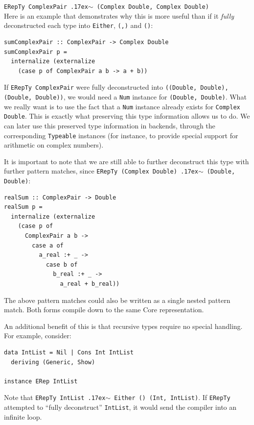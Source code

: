 \documentclass[runningheads, a4paper]{llncs}
\newcommand{\typeeq}{\raise.17ex\hbox{$\scriptstyle\mathtt{\sim}$}\,\;}
\newcommand{\ttt}{\texttt}
\begin{document}
\ttt{ERepTy ComplexPair \typeeq (Complex Double, Complex Double)}
\\

Here is an example that demonstrates why this is more useful than if it \textit{fully} deconstructed
each type into \ttt{Either}, \ttt{(,)} and \ttt{()}:

\begin{lstlisting}
sumComplexPair :: ComplexPair -> Complex Double
sumComplexPair p =
  internalize (externalize
    (case p of ComplexPair a b -> a + b))
\end{lstlisting}

If \ttt{ERepTy ComplexPair} were fully deconstructed into \ttt{((Double, Double),
(Double, Double))}, we would need a \ttt{Num} instance for \ttt{(Double,
Double)}.  What we really want is to use the fact that a \ttt{Num} instance
already exists for \ttt{Complex Double}. This is exactly what preserving this
type information allows us to do. We can later use this preserved type
information in backends, through the corresponding \ttt{Typeable} instances (for
instance, to provide special support for arithmetic on complex numbers).

It is important to note that we are still able to further deconstruct this type
with further pattern matches, since \ttt{ERepTy (Complex Double) \typeeq (Double, Double)}:

\begin{lstlisting}
realSum :: ComplexPair -> Double
realSum p =
  internalize (externalize
    (case p of
      ComplexPair a b ->
        case a of
          a_real :+ _ ->
            case b of
              b_real :+ _ ->
                a_real + b_real))
\end{lstlisting}

The above pattern matches could also be written as a single nested pattern
match. Both forms compile down to the same Core representation.

An additional benefit of this is that recursive types require no special handling. For
example, consider:

\begin{lstlisting}
data IntList = Nil | Cons Int IntList
  deriving (Generic, Show)

instance ERep IntList
\end{lstlisting}

Note that \ttt{ERepTy IntList \typeeq Either () (Int, IntList)}. If \ttt{ERepTy}
attempted to ``fully deconstruct'' \ttt{IntList}, it would send the compiler
into an infinite loop.
\end{document}
